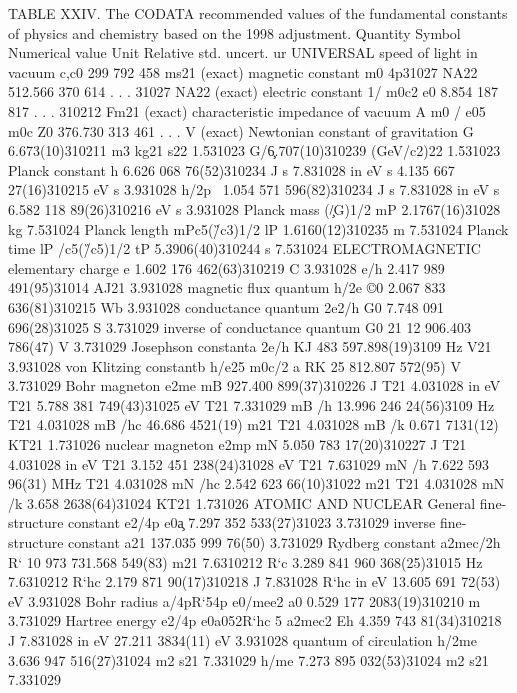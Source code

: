 TABLE XXIV. The CODATA recommended values of the fundamental
constants of physics and chemistry based on the 1998 adjustment.
Quantity Symbol Numerical value Unit Relative std. uncert. ur
UNIVERSAL speed of light in vacuum c,c0 299 792 458 ms21 (exact)
magnetic constant m0 4p31027 NA22 512.566 370 614 . . . 31027 NA22
(exact) electric constant 1/ m0c2 e0 8.854 187 817 . . . 310212
Fm21 (exact) characteristic impedance of vacuum A m0 / e05 m0c Z0
376.730 313 461 . . . V (exact) Newtonian constant of gravitation
G 6.673(10)310211 m3 kg21 s22 1.531023 G/\c 6.707(10)310239
(GeV/c2)22 1.531023 Planck constant h 6.626 068 76(52)310234 J s
7.831028 in eV s 4.135 667 27(16)310215 eV s 3.931028 h/2p \ 1.054
571 596(82)310234 J s 7.831028 in eV s 6.582 118 89(26)310216 eV s
3.931028 Planck mass (\c/G)1/2 mP 2.1767(16)31028 kg 7.531024
Planck length \/mPc5(\G/c3)1/2 lP 1.6160(12)310235 m 7.531024
Planck time lP /c5(\G/c5)1/2 tP 5.3906(40)310244 s 7.531024
ELECTROMAGNETIC elementary charge e 1.602 176 462(63)310219 C
3.931028 e/h 2.417 989 491(95)31014 AJ21 3.931028 magnetic flux
quantum h/2e ©0 2.067 833 636(81)310215 Wb 3.931028 conductance
quantum 2e2/h G0 7.748 091 696(28)31025 S 3.731029 inverse of
conductance quantum G0 21 12 906.403 786(47) V 3.731029 Josephson
constanta 2e/h KJ 483 597.898(19)3109 Hz V21 3.931028 von Klitzing
constantb h/e25 m0c/2 a RK 25 812.807 572(95) V 3.731029 Bohr
magneton e\/2me mB 927.400 899(37)310226 J T21 4.031028 in eV T21
5.788 381 749(43)31025 eV T21 7.331029 mB /h 13.996 246 24(56)3109
Hz T21 4.031028 mB /hc 46.686 4521(19) m21 T21 4.031028 mB /k
0.671 7131(12) KT21 1.731026 nuclear magneton e\/2mp mN 5.050 783
17(20)310227 J T21 4.031028 in eV T21 3.152 451 238(24)31028 eV
T21 7.631029 mN /h 7.622 593 96(31) MHz T21 4.031028 mN /hc 2.542
623 66(10)31022 m21 T21 4.031028 mN /k 3.658 2638(64)31024 KT21
1.731026 ATOMIC AND NUCLEAR General fine-structure constant e2/4p
e0\c a 7.297 352 533(27)31023 3.731029 inverse fine-structure
constant a21 137.035 999 76(50) 3.731029 Rydberg constant a2mec/2h
R` 10 973 731.568 549(83) m21 7.6310212 R`c 3.289 841 960
368(25)31015 Hz 7.6310212 R`hc 2.179 871 90(17)310218 J 7.831028
R`hc in eV 13.605 691 72(53) eV 3.931028 Bohr radius a/4pR`54p
e0\2/mee2 a0 0.529 177 2083(19)310210 m 3.731029 Hartree energy
e2/4p e0a052R`hc 5 a2mec2 Eh 4.359 743 81(34)310218 J 7.831028 in
eV 27.211 3834(11) eV 3.931028 quantum of circulation h/2me 3.636
947 516(27)31024 m2 s21 7.331029 h/me 7.273 895 032(53)31024 m2
s21 7.331029
